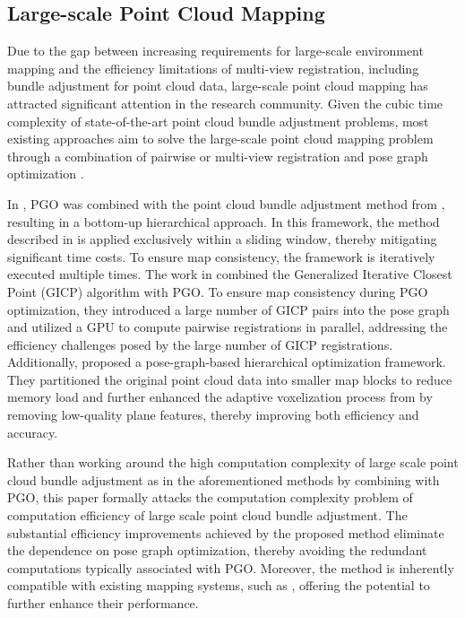 \subsection{Large-scale Point Cloud Mapping}
Due to the gap between increasing requirements for large-scale environment mapping and the efficiency limitations of multi-view registration, including bundle adjustment for point cloud data, large-scale point cloud mapping has attracted significant attention in the research community.
Given the cubic time complexity of state-of-the-art point cloud bundle adjustment problems, most existing approaches aim to solve the large-scale point cloud mapping problem through a combination of pairwise or multi-view registration and pose graph optimization \cite{gpugicp, hba, pang2024lm}.

In \cite{hba}, PGO was combined with the point cloud bundle adjustment method from \cite{liu2023efficient}, resulting in a bottom-up hierarchical approach. In this framework, the method described in \cite{liu2023efficient} is applied exclusively within a sliding window, thereby mitigating significant time costs. To ensure map consistency, the framework is iteratively executed multiple times.
The work in \cite{gpugicp} combined the Generalized Iterative Closest Point (GICP) algorithm with PGO. To ensure map consistency during PGO optimization, they introduced a large number of GICP pairs into the pose graph and utilized a GPU to compute pairwise registrations in parallel, addressing the efficiency challenges posed by the large number of GICP registrations.
Additionally, \cite{pang2024lm} proposed a pose-graph-based hierarchical optimization framework. They partitioned the original point cloud data into smaller map blocks to reduce memory load and further enhanced the adaptive voxelization process from \cite{liu2021balm} by removing low-quality plane features, thereby improving both efficiency and accuracy.

{Rather than working around the high computation complexity of large scale point cloud bundle adjustment as in the aforementioned methods by combining with PGO, this paper formally attacks the computation complexity problem of computation efficiency of large scale point cloud bundle adjustment. The substantial efficiency improvements achieved by the proposed method eliminate the dependence on pose graph optimization, thereby avoiding the redundant computations typically associated with PGO. Moreover, the method is inherently compatible with existing mapping systems, such as \cite{hba, pang2024lm}, offering the potential to further enhance their performance.}